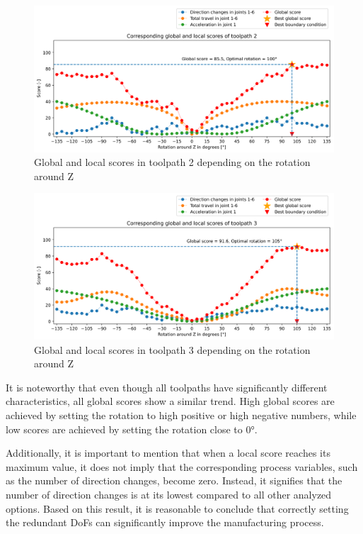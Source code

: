 \begin{figure}[H]
\centerline{\includegraphics[width=1\textwidth]{figures/best_c_2_combi.png}}
\caption{Global and local scores in toolpath 2 depending on the rotation around Z}
\label{TP2_combi}
\end{figure}
\begin{figure}[H]
\centerline{\includegraphics[width=1\textwidth]{figures/best_c_3_combi.png}}
\caption{Global and local scores in toolpath 3 depending on the rotation around Z}
\label{TP3_combi}
\end{figure}

It is noteworthy that even though all toolpaths have significantly different characteristics, all global scores show a similar trend. High global scores are achieved by setting the rotation to high positive or high negative numbers, while low scores are achieved by setting the rotation close to 0°. 

Additionally, it is important to mention that when a local score reaches its maximum value, it does not imply that the corresponding process variables, such as the number of direction changes, become zero. Instead, it signifies that the number of direction changes is at its lowest compared to all other analyzed options. Based on this result, it is reasonable to conclude that correctly setting the redundant \acrshort{DoF}s can significantly improve the manufacturing process.
\newpage
